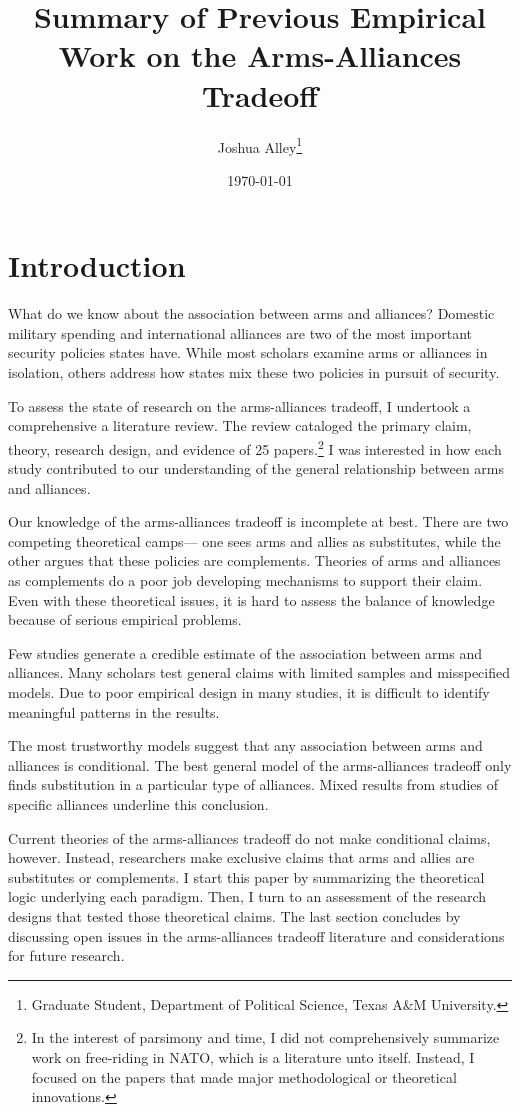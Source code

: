 \documentclass[12pt]{article}
\title{\textbf{Summary of Previous Empirical Work on the Arms-Alliances Tradeoff}}
\author{Joshua Alley\footnote{Graduate Student,
Department of Political Science, Texas A\&M University.}}
\date{{\normalsize \today}}
\begin{document}
\maketitle 


\section*{Introduction}

What do we know about the association between arms and alliances? Domestic military spending and international alliances are two of the most important security policies states have. While most scholars examine arms or alliances in isolation, others address how states mix these two policies in pursuit of security. 

To assess the state of research on the arms-alliances tradeoff, I undertook a comprehensive a literature review. The review cataloged the primary claim, theory, research design, and evidence of 25 papers.\footnote{In the interest of parsimony and time, I did not comprehensively summarize work on free-riding in NATO, which is a literature unto itself. Instead, I focused on the papers that made major methodological or theoretical innovations.} I was interested in how each study contributed to our understanding of the general relationship between arms and alliances. 

Our knowledge of the arms-alliances tradeoff is incomplete at best. There are two competing theoretical camps--- one sees arms and allies as substitutes, while the other argues that these policies are complements. Theories of arms and alliances as complements do a poor job developing mechanisms to support their claim. Even with these theoretical issues, it is hard to assess the balance of knowledge because of serious empirical problems. 

Few studies generate a credible estimate of the association between arms and alliances. Many scholars test general claims with limited samples and misspecified models. Due to poor empirical design in many studies, it is difficult to identify meaningful patterns in the results. 

The most trustworthy models suggest that any association between arms and alliances is conditional. The best general model of the arms-alliances tradeoff only finds substitution in a particular type of alliances. Mixed results from studies of specific alliances underline this conclusion. 

Current theories of the arms-alliances tradeoff do not make conditional claims, however. Instead, researchers make exclusive claims that arms and allies are substitutes or complements. I start this paper by summarizing the theoretical logic underlying each paradigm. Then, I turn to an assessment of the research designs that tested those theoretical claims. The last section concludes by discussing open issues in the arms-alliances tradeoff literature and considerations for future research. 
\end{document}
